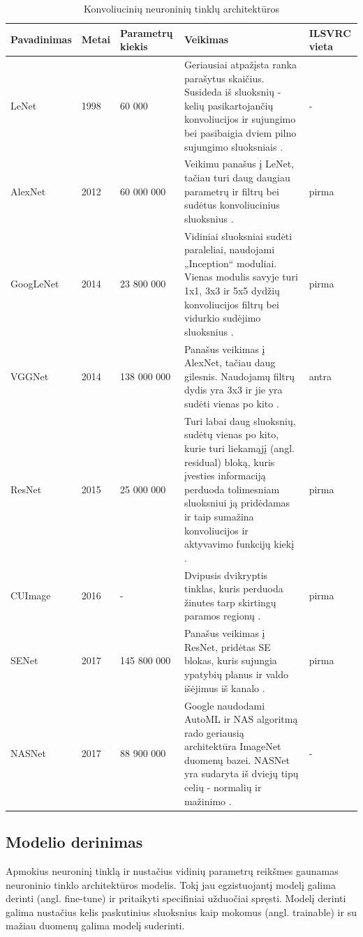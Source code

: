 \documentclass{VUMIFPSbakalaurinis}
\begin{document}
\begin{longtable}[h]{ | p{2cm} | p{1cm} | p{3cm} | p{7cm} | p{1.5cm} | } 
\caption{Konvoliucinių neuroninių tinklų architektūros} \\
\hline
Pavadinimas & Metai & Parametrų kiekis & Veikimas & ILSVRC vieta \\
\hline
\endhead
LeNet & 1998 & 60 000 & Geriausiai atpažįsta ranka parašytus skaičius. Susideda iš sluoksnių - kelių pasikartojančių konvoliucijos ir sujungimo bei pasibaigia dviem pilno sujungimo sluoksniais \cite{lecun1995comparison}. & - \\
\hline
AlexNet & 2012 & 60 000 000 & Veikimu panašus į LeNet, tačiau turi daug daugiau parametrų ir filtrų bei sudėtus konvoliucinius sluoksnius \cite{DBLP:journals/corr/abs-1803-01164}.  & pirma \\
\hline
GoogLeNet & 2014 & 23 800 000 & Vidiniai sluoksniai sudėti paraleliai, naudojami „Inception“ moduliai. Vienas modulis savyje turi 1x1, 3x3 ir 5x5 dydžių konvoliucijos filtrų bei vidurkio sudėjimo sluoksnius \cite{DBLP:journals/corr/SzegedyLJSRAEVR14}. & pirma \\
\hline
VGGNet & 2014 & 138 000 000 & Panašus veikimas į AlexNet, tačiau daug gilesnis. Naudojamų filtrų dydis yra 3x3 ir jie yra sudėti vienas po kito \cite{Simonyan2015VeryDC}. & antra \\
\hline
ResNet & 2015 & 25 000 000 & Turi labai daug sluoksnių, sudėtų vienas po kito, kurie turi liekamąjį (angl. residual) bloką, kuris įvesties informaciją perduoda tolimesniam sluoksniui ją pridėdamas ir taip sumažina konvoliucijos ir aktyvavimo funkcijų kiekį \cite{DBLP:journals/corr/TargAL16}.  & pirma \\
\hline
CUImage & 2016 & - & Dvipusis dvikryptis tinklas, kuris perduoda žinutes tarp skirtingų paramos regionų \cite{Peng2018CUImageAN}. & pirma \\
\hline
SENet & 2017 & 145 800 000 & Panašus veikimas į ResNet, pridėtas SE blokas, kuris sujungia ypatybių planus ir valdo išėjimus iš kanalo \cite{DBLP:journals/corr/abs-1709-01507}.  & pirma \\
\hline
NASNet & 2017 & 88 900 000 & Google naudodami AutoML ir NAS algoritmą rado geriausią architektūra ImageNet duomenų bazei. NASNet yra sudaryta iš dviejų tipų celių - normalių ir mažinimo \cite{DBLP:journals/corr/ZophVSL17}. & - \\ 
\hline
\end{longtable}

\subsection{Modelio derinimas}
Apmokius neuroninį tinklą ir nustačius vidinių parametrų reikšmes gaunamas neuroninio tinklo architektūros modelis. Tokį jau egzistuojantį modelį galima derinti (angl. fine-tune) 
ir pritaikyti specifiniai užduočiai spręsti. Modelį derinti galima nustačius kelis paskutinius sluoksnius kaip mokomus (angl. trainable) ir su mažiau duomenų galima modelį suderinti.
\end{document}
